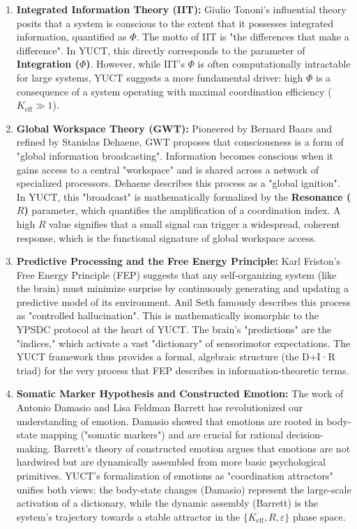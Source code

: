\documentclass[12pt,a4paper]{article}
\begin{document}
	\begin{enumerate}
		\item \textbf{Integrated Information Theory (IIT):} Giulio Tononi's influential theory posits that a system is conscious to the extent that it possesses integrated information, quantified as \(\Phi\). The motto of IIT is "the differences that make a difference". In YUCT, this directly corresponds to the parameter of \textbf{Integration (\(\Phi\))}. However, while IIT's \(\Phi\) is often computationally intractable for large systems, YUCT suggests a more fundamental driver: high \(\Phi\) is a consequence of a system operating with maximal coordination efficiency (\(K_{\mathrm{eff}} \gg 1\)).
		
		\item \textbf{Global Workspace Theory (GWT):} Pioneered by Bernard Baars and refined by Stanislas Dehaene, GWT proposes that consciousness is a form of "global information broadcasting". Information becomes conscious when it gains access to a central "workspace" and is shared across a network of specialized processors. Dehaene describes this process as a "global ignition". In YUCT, this "broadcast" is mathematically formalized by the \textbf{Resonance (\(R\))} parameter, which quantifies the amplification of a coordination index. A high \(R\) value signifies that a small signal can trigger a widespread, coherent response, which is the functional signature of global workspace access.
		
		\item \textbf{Predictive Processing and the Free Energy Principle:} Karl Friston's Free Energy Principle (FEP) suggests that any self-organizing system (like the brain) must minimize surprise by continuously generating and updating a predictive model of its environment. Anil Seth famously describes this process as "controlled hallucination". This is mathematically isomorphic to the YPSDC protocol at the heart of YUCT. The brain's "predictions" are the "indices," which activate a vast "dictionary" of sensorimotor expectations. The YUCT framework thus provides a formal, algebraic structure (the D+I·R triad) for the very process that FEP describes in information-theoretic terms.
		
		\item \textbf{Somatic Marker Hypothesis and Constructed Emotion:} The work of Antonio Damasio and Lisa Feldman Barrett has revolutionized our understanding of emotion. Damasio showed that emotions are rooted in body-state mapping ("somatic markers") and are crucial for rational decision-making. Barrett's theory of constructed emotion argues that emotions are not hardwired but are dynamically assembled from more basic psychological primitives. YUCT's formalization of emotions as "coordination attractors" unifies both views: the body-state changes (Damasio) represent the large-scale activation of a dictionary, while the dynamic assembly (Barrett) is the system's trajectory towards a stable attractor in the \(\{K_{\mathrm{eff}}, R, \varepsilon\}\) phase space.
	\end{enumerate}
	
\end{document}
